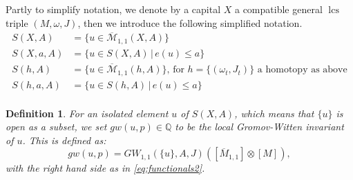 \documentclass{amsart}
\numberwithin{equation}{section}
\newtheorem{definition}[equation]{Definition}
\theoremstyle{definition}
\theoremstyle{remark}
\DeclareMathOperator{\lcs}{lcs}
\begin{document}
   Partly to simplify notation, we denote by a capital $X$ a compatible general $\lcs$ triple $(M,\omega, J)$, then we introduce the following simplified notation.
\begin{equation}
\begin{aligned}
   S  (X,A)  & = \{u \in \overline{\mathcal{M}} _{1,1} (X,A) \} \\
   S  (X,a,A)  & = \{u \in S  (X,A)  \, \left .  \right | \, e (u)
   \leq a \} \\ 
   S  (h,A)  & = \{u \in \overline{\mathcal{M}} _{1,1} (h,A) \} 
\text{, for $h = \{(\omega _{t}, J _{t}  )\}$ a homotopy as above}
\\
S  (h,a, A)  & = \{u \in S  (h,A)     \, \left .  \right | \,  e (u) \leq a \} \\
\end{aligned} 
\end{equation}
\begin{definition} \label{def:indexmultiplicity} For an isolated element $u$ of $S (X,A)$, which means that $\{u\}$ is open as a subset, we set $gw (u,p) \in \mathbb{Q}$ to be the local Gromov-Witten invariant of $u$. This is defined as:
\begin{equation*}
   gw (u,p)= GW _{1,1}  (\{u\}, A, J) ([ \overline {M} _{1,1}] \otimes [M]),
\end{equation*}
with the right hand side as in \eqref{eq:functionals2}.
\end{definition}
\end{document}
